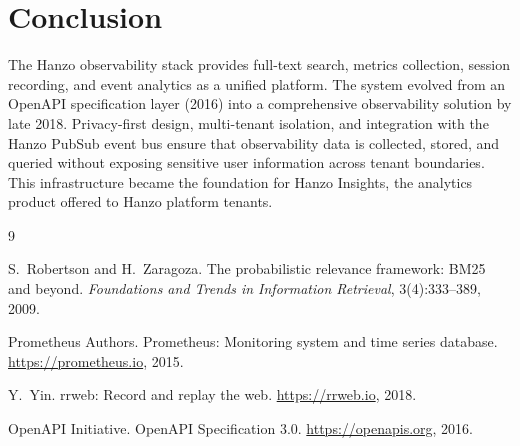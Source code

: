 \documentclass[11pt,a4paper]{article}
\begin{document}
\section{Conclusion}

The Hanzo observability stack provides full-text search, metrics collection, session recording, and event analytics as a unified platform. The system evolved from an OpenAPI specification layer (2016) into a comprehensive observability solution by late 2018. Privacy-first design, multi-tenant isolation, and integration with the Hanzo PubSub event bus ensure that observability data is collected, stored, and queried without exposing sensitive user information across tenant boundaries. This infrastructure became the foundation for Hanzo Insights, the analytics product offered to Hanzo platform tenants.


\begin{thebibliography}{9}

S.~Robertson and H.~Zaragoza. The probabilistic relevance framework: BM25 and beyond. \textit{Foundations and Trends in Information Retrieval}, 3(4):333--389, 2009.

Prometheus Authors. Prometheus: Monitoring system and time series database. \url{https://prometheus.io}, 2015.

Y.~Yin. rrweb: Record and replay the web. \url{https://rrweb.io}, 2018.

OpenAPI Initiative. OpenAPI Specification 3.0. \url{https://openapis.org}, 2016.

\end{thebibliography}
\end{document}
